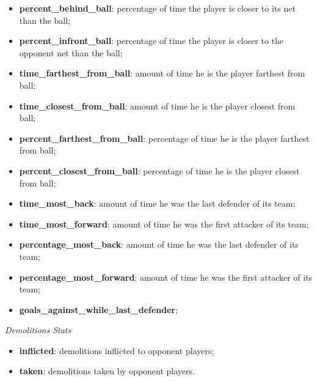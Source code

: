 \begin{itemize}
    \item \textbf{percent\_behind\_ball}: percentage of time the player is closer to its net than the ball; \\
    \item \textbf{percent\_infront\_ball}: percentage of time the player is closer to the opponent net than the ball; \\
    \item \textbf{time\_farthest\_from\_ball}: amount of time he is the player farthest from ball; \\
    \item \textbf{time\_closest\_from\_ball}: amount of time he is the player closest from ball; \\
    \item \textbf{percent\_farthest\_from\_ball}: percentage of time he is the player farthest from ball; \\
    \item \textbf{percent\_closest\_from\_ball}: percentage of time he is the player closest from ball; \\
    \item \textbf{time\_most\_back}: amount of time he was the last defender of its team; \\
    \item \textbf{time\_most\_forward}: amount of time he was the first attacker of its team; \\
    \item \textbf{percentage\_most\_back}: amount of time he was the last defender of its team; \\
    \item \textbf{percentage\_most\_forward}: amount of time he was the first attacker of its team; \\
    \item \textbf{goals\_against\_while\_last\_defender};
\end{itemize}
\begin{center}
    \textit{Demolitions Stats}
\end{center}
\begin{itemize}
    \item \textbf{inflicted}: demolitions inflicted to opponent players;
    \item \textbf{taken}: demolitions taken by opponent players.
\end{itemize}